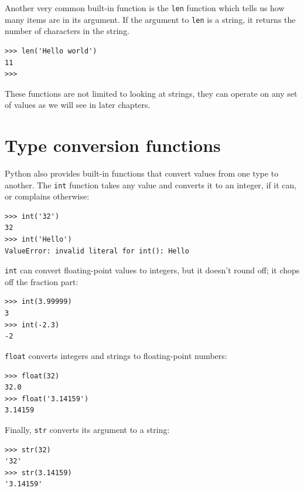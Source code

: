 \documentclass[10pt]{book}
\begin{document}
Another very common built-in function is the {\tt len} function
which tells us how many items are in its argument. If the argument
to {\tt len} is a string, it returns the number of characters 
in the string.

\beforeverb
\begin{verbatim}
>>> len('Hello world')
11
>>>
\end{verbatim}
\afterverb
%
These functions are not limited to looking at strings, they can operate
on any set of values as we will see in later chapters.

\section{Type conversion functions}



Python also provides built-in functions that convert values
from one type to another.  The {\tt int} function takes any value and
converts it to an integer, if it can, or complains otherwise:


\beforeverb
\begin{verbatim}
>>> int('32')
32
>>> int('Hello')
ValueError: invalid literal for int(): Hello
\end{verbatim}
\afterverb
%
{\tt int} can convert floating-point values to integers, but it
doesn't round off; it chops off the fraction part:

\beforeverb
\begin{verbatim}
>>> int(3.99999)
3
>>> int(-2.3)
-2
\end{verbatim}
\afterverb
%
{\tt float} converts integers and strings to floating-point
numbers:


\beforeverb
\begin{verbatim}
>>> float(32)
32.0
>>> float('3.14159')
3.14159
\end{verbatim}
\afterverb
%
Finally, {\tt str} converts its argument to a string:


\beforeverb
\begin{verbatim}
>>> str(32)
'32'
>>> str(3.14159)
'3.14159'
\end{verbatim}
\afterverb
%
\end{document}
